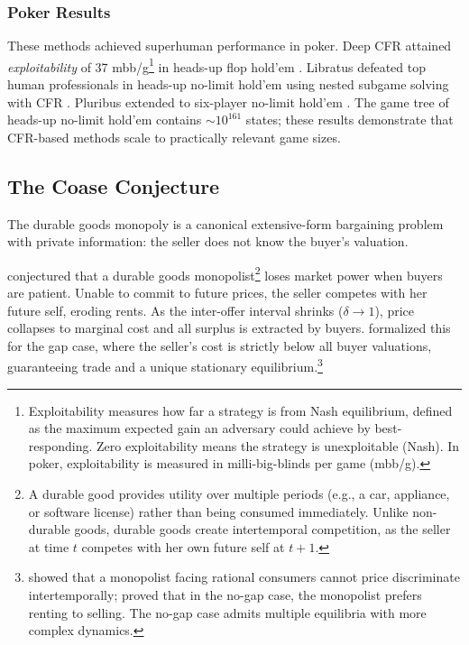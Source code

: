 \subsubsection{Poker Results}

These methods achieved superhuman performance in poker. Deep CFR attained \emph{exploitability} of 37 mbb/g\footnote{Exploitability measures how far a strategy is from Nash equilibrium, defined as the maximum expected gain an adversary could achieve by best-responding. Zero exploitability means the strategy is unexploitable (Nash). In poker, exploitability is measured in milli-big-blinds per game (mbb/g).} in heads-up flop hold'em \citep{Brown2019}. Libratus defeated top human professionals in heads-up no-limit hold'em using nested subgame solving with CFR \citep{brown2017superhuman}. Pluribus extended to six-player no-limit hold'em \citep{brown2019superhuman}. The game tree of heads-up no-limit hold'em contains $\sim 10^{161}$ states; these results demonstrate that CFR-based methods scale to practically relevant game sizes.

\subsection{The Coase Conjecture}

The durable goods monopoly is a canonical extensive-form bargaining problem with private information: the seller does not know the buyer's valuation.

\citet{coase1972durability} conjectured that a durable goods monopolist\footnote{A durable good provides utility over multiple periods (e.g., a car, appliance, or software license) rather than being consumed immediately. Unlike non-durable goods, durable goods create intertemporal competition, as the seller at time $t$ competes with her own future self at $t+1$.} loses market power when buyers are patient. Unable to commit to future prices, the seller competes with her future self, eroding rents. As the inter-offer interval shrinks ($\delta \to 1$), price collapses to marginal cost and all surplus is extracted by buyers. \citet{gul1986foundations} formalized this for the gap case, where the seller's cost is strictly below all buyer valuations, guaranteeing trade and a unique stationary equilibrium.\footnote{\citet{stokey1981rational} showed that a monopolist facing rational consumers cannot price discriminate intertemporally; \citet{bulow1982durable} proved that in the no-gap case, the monopolist prefers renting to selling. The no-gap case admits multiple equilibria with more complex dynamics.}

